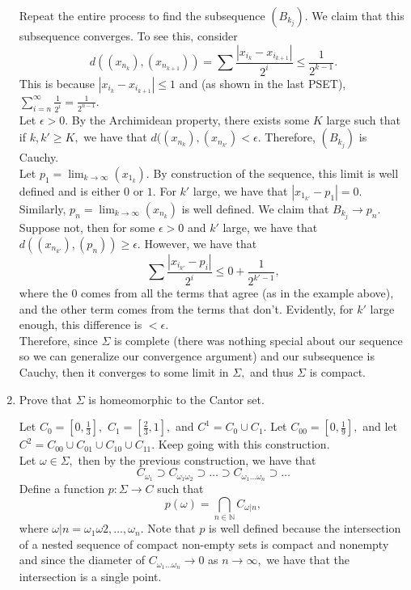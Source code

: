 \documentclass[11pt]{article}
\newcommand{\bbN}{\mathbb{N}}
\begin{document}
\begin{enumerate}
\begin{solution}
        Repeat the entire process to find the subsequence $(B_{k_j}).$ We claim that this subsequence converges.
        To see this, consider 
        \[d((x_{n_k}), (x_{n_{k+1}})) = \sum\frac{|x_{i_k} - x_{i_{k+1}}|}{2^i} \leq \frac{1}{2^{k-1}}.\] This is because $|x_{i_k} - x_{i_{k+1}}|\leq 1$ and (as shown in the last PSET), $\sum_{i=n}^\infty\frac{1}{2^i} = \frac{1}{2^{n-1}}.$\\
        
        Let $\epsilon>0.$ By the Archimidean property, there exists some $K$ large such that if $k, k'\geq K,$ we have that $d((x_{n_k}), (x_{n_{k'}})<\epsilon.$ Therefore, $(B_{k_j})$ is Cauchy. \\

        Let $p_1 = \displaystyle\lim_{k\to \infty}(x_{1_k}).$ By construction of the sequence, this limit is well defined and is either $0$ or $1.$ For $k'$ large, we have that $|x_{1_{k'}} - p_1| = 0.$ Similarly, $p_n = \displaystyle\lim_{k\to \infty}(x_{n_k})$ is well defined. We claim that $B_{k_j}\to p_n.$ Suppose not, then for some $\epsilon>0$ and $k'$ large, we have that $d((x_{n_{k'}}), (p_n))\geq \epsilon.$ However, we have that 
        \[\sum\frac{|x_{i_{k'}} - p_i|}{2^i}\leq 0 + \frac{1}{2^{{k'-1}}},\] where the $0$ comes from all the terms that agree (as in the example above), and the other term comes from the terms that don't. Evidently, for $k'$ large enough, this difference is $<\epsilon.$\\

        Therefore, since $\Sigma$ is complete (there was nothing special about our sequence so we can generalize our convergence argument) and our subsequence is Cauchy, then it converges to some limit in $\Sigma,$ and thus $\Sigma$ is compact.
    \end{solution}
    \item 
    \begin{problem}
        Prove that $\Sigma$ is homeomorphic to the Cantor set.
    \end{problem}
    \begin{solution}
        Let $C_0 = [0,\frac{1}{3}],$ $C_1 = [\frac{2}{3},1],$ and $C^1 = C_0 \cup C_1.$ Let $C_{00} = [0, \frac{1}{9}],$ and let $C^2 = C_{00} \cup C_{01} \cup C_{10}\cup C_{11}.$ Keep going with this construction.\\
        Let $\omega \in \Sigma,$ then by the previous construction, we have that \[C_{\omega_1} \supset C_{\omega_1\omega_2}\supset \dots \supset C_{\omega_1\dots \omega_n}\supset \dots\]
        Define a function $p: \Sigma \to C$ such that \[p(\omega) = \bigcap_{n\in \bbN}C_{\omega | n},\] where $\omega | n = \omega_1\omega2,\dots, \omega_n.$ Note that $p$ is well defined because the intersection of a nested sequence of compact non-empty sets is compact and nonempty and since the diameter of $C_{\omega_1\dots\omega_n}\to 0$ as $n\to \infty,$ we have that the intersection is a single point.\\
        

\end{solution}
\end{enumerate}
\end{document}
